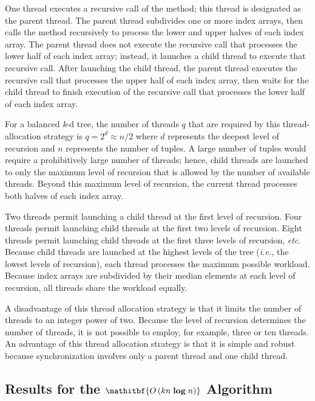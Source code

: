 \documentclass{sig-alternate}
\begin{document}
One thread executes a recursive call of the method; this thread is designated as the parent thread.  The parent thread subdivides one or more index arrays, then calls the method recursively to process the lower and upper halves of each index array.  The parent thread does not execute the recursive call that processes the lower half of each index array; instead, it launches a child thread to execute that recursive call.  After launching the child thread, the parent thread executes the recursive call that processes the upper half of each index array, then waits for the child thread to finish execution of the recursive call that processes the lower half of each index array.

For a balanced \emph{k}-d tree, the number of threads $q$ that are required by this thread-allocation strategy is $q = 2^d \approx n / 2$ where $d$ represents the deepest level of recursion and $n$ represents the number of tuples.  A large number of tuples would require a prohibitively large number of threads; hence, child threads are launched to only the maximum level of recursion that is allowed by the number of available threads.  Beyond this maximum level of recursion, the current thread processes both halves of each index array.

Two threads permit launching a child thread at the first level of recursion.  Four threads permit launching child threads at the first two levels of recursion. Eight threads permit launching child threads at the first three levels of recursion, \emph{etc}.  Because child threads are launched at the highest levels of the tree (\emph{i.e.,} the lowest levels of recursion), each thread processes the maximum possible workload.  Because index arrays are subdivided by their median elements at each level of recursion, all threads share the workload equally.

A disadvantage of this thread allocation strategy is that it limits the number of threads to an integer power of two.  Because the level of recursion determines the number of threads, it is not possible to employ, for example, three or ten threads.  An advantage of this thread allocation strategy is that it is simple and robust because synchronization involves only a parent thread and one child thread.

\subsection{Results for the $\mathitbf{O\left(kn \; \boldsymbol{\log} \; n\right)}$ Algorithm}
\label{sec:knlogn_results}
\end{document}
